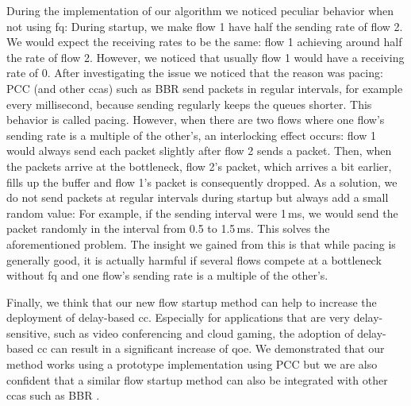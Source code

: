 \documentclass[runningheads]{llncs}
\begin{document}
During the implementation of our algorithm we noticed peculiar behavior when not using \gls{fq}: During startup, we make flow 1 have half the sending rate of flow 2. We would expect the receiving rates to be the same: flow 1 achieving around half the rate of flow 2. However, we noticed that usually flow 1 would have a receiving rate of 0. After investigating the issue we noticed that the reason was pacing: PCC (and other \glspl{cca}) such as BBR send packets in regular intervals, for example every millisecond, because sending regularly keeps the queues shorter. This behavior is called pacing. However, when there are two flows where one flow's sending rate is a multiple of the other's, an interlocking effect occurs: flow 1 would always send each packet slightly after flow 2 sends a packet. Then, when the packets arrive at the bottleneck, flow 2's packet, which arrives a bit earlier, fills up the buffer and flow 1's packet is consequently dropped. As a solution, we do not send packets at regular intervals during startup but always add a small random value: For example, if the sending interval were 1\,ms, we would send the packet randomly in the interval from 0.5 to 1.5\,ms. This solves the aforementioned problem. The insight we gained from this is that while pacing is generally good, it is actually harmful if several flows compete at a bottleneck without \gls{fq} and one flow's sending rate is a multiple of the other's.

Finally, we think that our new flow startup method can help to increase the deployment of delay-based \gls{cc}. Especially for applications that are very delay-sensitive, such as video conferencing and cloud gaming, the adoption of delay-based \gls{cc} can result in a significant increase of \gls{qoe}. We demonstrated that our method works using a prototype implementation using PCC but we are also confident that a similar flow startup method can also be integrated with other \glspl{cca} such as BBR \cite{cardwell_bbr:_2016}. 



\end{document}
